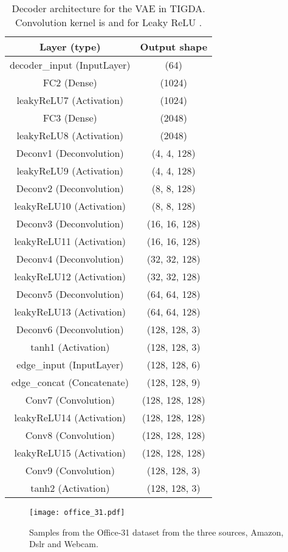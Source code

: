 \documentclass[journal,twoside,web]{IEEEtran}
\begin{document}
\begin{table*}
\caption{Decoder architecture for the VAE in TIGDA. Convolution kernel is  and for Leaky ReLU .}
\centering
  \begin{tabular}{cc}
    \toprule
        {Layer (type)} & Output shape 
        \\
    \midrule
    decoder\_input (InputLayer) & (64) \\
    FC2 (Dense) & (1024) \\
    leakyReLU7 (Activation) & (1024) \\
    FC3 (Dense) & (2048) \\
    leakyReLU8 (Activation) & (2048) \\
    Deconv1 (Deconvolution) & (4, 4, 128) \\
    leakyReLU9 (Activation) & (4, 4, 128) \\
     Deconv2 (Deconvolution) & (8, 8, 128) \\
     leakyReLU10 (Activation) & (8, 8, 128) \\
     Deconv3 (Deconvolution) & (16, 16, 128) \\
     leakyReLU11 (Activation) & (16, 16, 128) \\
     Deconv4 (Deconvolution) & (32, 32, 128) \\
     leakyReLU12 (Activation) & (32, 32, 128) \\
     Deconv5 (Deconvolution) & (64, 64, 128) \\
     leakyReLU13 (Activation) & (64, 64, 128) \\
     Deconv6 (Deconvolution) & (128, 128, 3) \\
     tanh1 (Activation) & (128, 128, 3) \\
     edge\_input (InputLayer) & (128, 128, 6)\\
     edge\_concat (Concatenate) & (128, 128, 9)\\
  Conv7 (Convolution) & (128, 128, 128) \\
  leakyReLU14 (Activation) & (128, 128, 128) \\
    Conv8 (Convolution) & (128, 128, 128) \\
    leakyReLU15 (Activation) & (128, 128, 128) \\
    Conv9 (Convolution) & (128, 128, 3) \\
    tanh2 (Activation) & (128, 128, 3) \\
    \bottomrule
  \end{tabular}
  \label{table:enc}
\end{table*}


\begin{figure*}[t]

\centering
 \texttt{[image: office\_31.pdf]}
\caption{Samples from the Office-31 dataset from the three sources, Amazon, Dslr and Webcam.}
\label{fig:office31}
\end{figure*}
\end{document}
